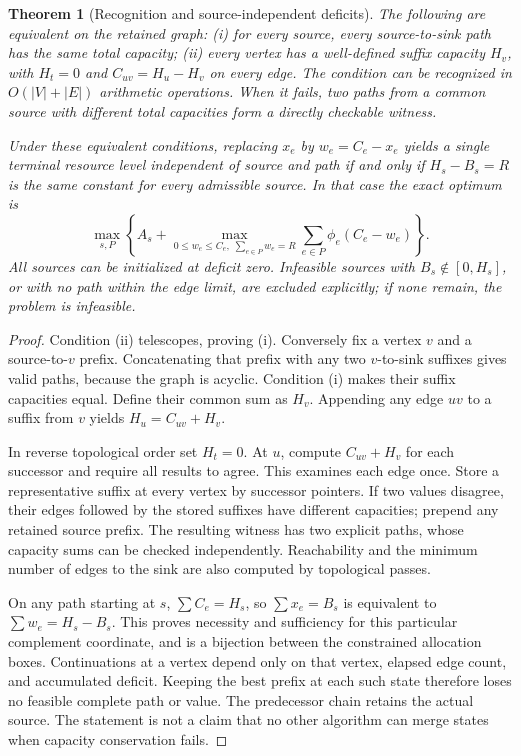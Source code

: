 \documentclass[11pt,letterpaper]{article}
\newtheorem{theorem}{Theorem}[section]
\theoremstyle{definition}\newtheorem{remark}[theorem]{Remark}
\begin{document}
\begin{theorem}[Recognition and source-independent deficits]\label{thm:recognition59}
The following are equivalent on the retained graph: (i) for every source, every source-to-sink path has the same total capacity; (ii) every vertex has a well-defined suffix capacity $H_v$, with $H_t=0$ and $C_{uv}=H_u-H_v$ on every edge. The condition can be recognized in $O(|V|+|E|)$ arithmetic operations. When it fails, two paths from a common source with different total capacities form a directly checkable witness.

Under these equivalent conditions, replacing $x_e$ by $w_e=C_e-x_e$ yields a single terminal resource level independent of source and path if and only if $H_s-B_s=R$ is the same constant for every admissible source. In that case the exact optimum is
\[
 \max_{s,P}\left\{A_s+\max_{0\leq w_e\leq C_e,\;\sum_{e\in P}w_e=R}
                  \sum_{e\in P}\phi_e(C_e-w_e)\right\}.
\]
All sources can be initialized at deficit zero. Infeasible sources with $B_s\notin[0,H_s]$, or with no path within the edge limit, are excluded explicitly; if none remain, the problem is infeasible.
\end{theorem}
\begin{proof}
Condition (ii) telescopes, proving (i). Conversely fix a vertex $v$ and a source-to-$v$ prefix. Concatenating that prefix with any two $v$-to-sink suffixes gives valid paths, because the graph is acyclic. Condition (i) makes their suffix capacities equal. Define their common sum as $H_v$. Appending any edge $uv$ to a suffix from $v$ yields $H_u=C_{uv}+H_v$.

In reverse topological order set $H_t=0$. At $u$, compute $C_{uv}+H_v$ for each successor and require all results to agree. This examines each edge once. Store a representative suffix at every vertex by successor pointers. If two values disagree, their edges followed by the stored suffixes have different capacities; prepend any retained source prefix. The resulting witness has two explicit paths, whose capacity sums can be checked independently. Reachability and the minimum number of edges to the sink are also computed by topological passes.

On any path starting at $s$, $\sum C_e=H_s$, so $\sum x_e=B_s$ is equivalent to $\sum w_e=H_s-B_s$. This proves necessity and sufficiency for this particular complement coordinate, and is a bijection between the constrained allocation boxes. Continuations at a vertex depend only on that vertex, elapsed edge count, and accumulated deficit. Keeping the best prefix at each such state therefore loses no feasible complete path or value. The predecessor chain retains the actual source. The statement is not a claim that no other algorithm can merge states when capacity conservation fails.
\end{proof}
\end{document}
